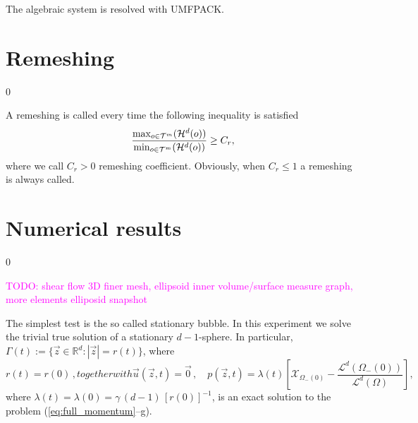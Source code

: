 \documentclass[a4paper,12pt,onecolumn]{article}
\newcommand{\R}{{\mathbb R}}
\newcommand{\bigchi}{\ensuremath{\mathrm{\mathcal{X}}}}
\newcommand{\charfcn}[1]{\bigchi_{#1}} %
\newcommand{\sigmaO}{o}
\begin{document}
The algebraic system is resolved with UMFPACK.

\section{Remeshing} \label{sec:remeshing}
\setcounter{equation} 0

A remeshing is called every time the following inequality is satisfied
\begin{equation}\label{eq:remesh_criteria}
\frac{\max_{\sigmaO\in {\cal T}^m}(\mathcal{H}^{d}(\sigmaO))}{\min_{\sigmaO\in\mathcal {T}^m}(\mathcal{H}^{d}(\sigmaO))}\geq C_r,
\end{equation}
where we call $C_r>0$ remeshing coefficient. Obviously, when $C_r\leq 1$ a remeshing is always called.

\section{Numerical results} \label{sec:numerical_results}
\setcounter{equation} 0

\textcolor{magenta}{TODO: shear flow 3D finer mesh, ellipsoid inner volume/surface measure graph, more elements elliposid snapshot}

The simplest test is the so called stationary bubble. In this experiment we solve the trivial true solution of a stationary $d-1$-sphere. In particular, $\Gamma(t) := \{ \vec z \in \R^d : |\vec z| = r(t)\}$, where
\begin{subequations}
\begin{equation} \label{eq:radialr}
r(t) = r(0)\,,
\end{equation}
together with 
\begin{equation} \label{eq:radialup}
\vec u(\vec z, t) = \vec 0 \,,\quad
p(\vec z, t) = \lambda(t)\left[\charfcn{\Omega_-(0)}
-\frac{\mathcal{L}^d(\Omega_-(0))}{\mathcal{L}^d(\Omega)} \right] ,
\end{equation}
\end{subequations}
where $\lambda(t) = \lambda(0) = \gamma\,(d-1)\,[r(0)]^{-1}$, is an exact solution to the problem (\ref{eq:full_momentum}--g).
\end{document}
